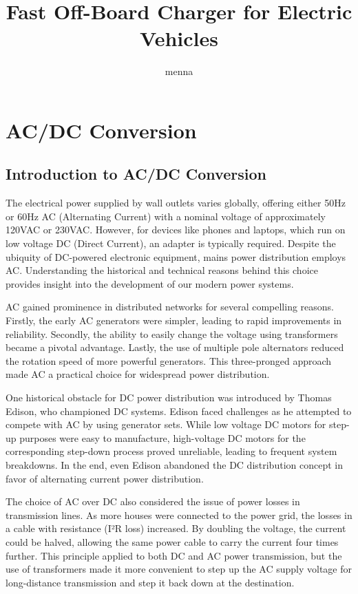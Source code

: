 \documentclass[12pt,a4paper]{book}
\author{menna}
\title{Fast Off-Board Charger for Electric Vehicles}
\begin{document}
\maketitle
\setcounter{tocdepth}{4}
\tableofcontents
\listoffigures
\listoftables

\part{AC/DC Conversion}

\chapter{Introduction to AC/DC Conversion}
The electrical power supplied by wall outlets varies globally, offering either 50Hz or 60Hz AC (Alternating Current) with a nominal voltage of approximately 120VAC or 230VAC. However, for devices like phones and laptops, which run on low voltage DC (Direct Current), an adapter is typically required. Despite the ubiquity of DC-powered electronic equipment, mains power distribution employs AC. Understanding the historical and technical reasons behind this choice provides insight into the development of our modern power systems.

AC gained prominence in distributed networks for several compelling reasons. Firstly, the early AC generators were simpler, leading to rapid improvements in reliability. Secondly, the ability to easily change the voltage using transformers became a pivotal advantage. Lastly, the use of multiple pole alternators reduced the rotation speed of more powerful generators. This three-pronged approach made AC a practical choice for widespread power distribution.

One historical obstacle for DC power distribution was introduced by Thomas Edison, who championed DC systems. Edison faced challenges as he attempted to compete with AC by using generator sets. While low voltage DC motors for step-up purposes were easy to manufacture, high-voltage DC motors for the corresponding step-down process proved unreliable, leading to frequent system breakdowns. In the end, even Edison abandoned the DC distribution concept in favor of alternating current power distribution\cite{acdc2018}.

The choice of AC over DC also considered the issue of power losses in transmission lines. As more houses were connected to the power grid, the losses in a cable with resistance (I²R loss) increased. By doubling the voltage, the current could be halved, allowing the same power cable to carry the current four times further. This principle applied to both DC and AC power transmission, but the use of transformers made it more convenient to step up the AC supply voltage for long-distance transmission and step it back down at the destination.
\end{document}
